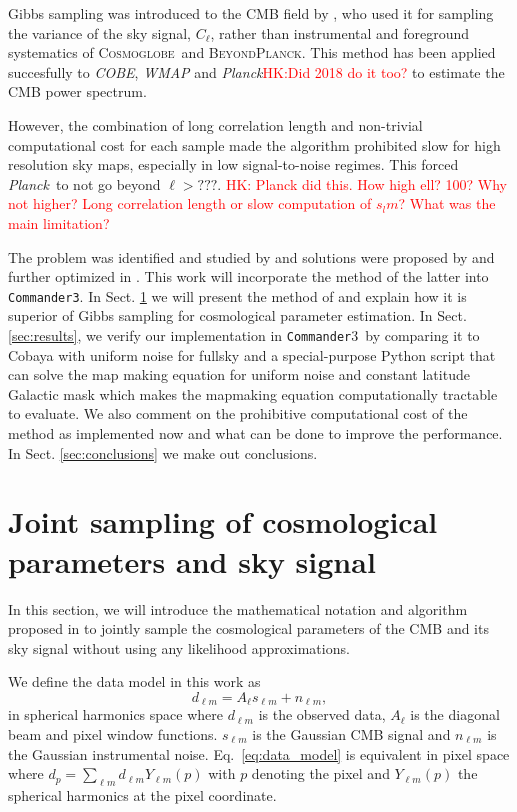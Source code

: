 \documentclass[twocolumn]{../common/aa}
\def\WMAP{\emph{WMAP}}
\def\COBE{\emph{COBE}}
\def\Planck{\emph{Planck}}
\def\commander{\texttt{Commander}}
\def\commanderthree{\texttt{Commander3}}
\newcommand{\BP}{\textsc{BeyondPlanck}}
\newcommand{\cosmoglobe}{\textsc{Cosmoglobe}}
\begin{document}
Gibbs sampling was introduced to the CMB field by \citet{jewell2004}, who used it for sampling the variance of the sky signal, $C_{\ell}$, rather than instrumental and foreground systematics of \cosmoglobe\ and \BP. This method has been applied succesfully to \COBE\citep{wandelt2004}, \WMAP\citep{Eriksen:2007jw} and \Planck\citep{planck2014-a13}\textcolor{red}{HK:Did 2018 do it too?} to estimate the CMB power spectrum.

However, the combination of long correlation length and non-trivial computational cost for each sample made the algorithm prohibited slow for high resolution sky maps, especially in low signal-to-noise regimes. This forced \Planck\ to not go beyond $\ell > ???$. \textcolor{red}{HK: Planck did this. How high ell? 100? Why not higher? Long correlation length or slow computation of $s_lm$? What was the main limitation?}

The problem was identified and studied by \cite{Eriksen:2004ss} and solutions were proposed by \cite{jewell:2009} and further optimized in \citet{racine:2016}. This work will incorporate the method of the latter into \commanderthree. In Sect. \ref{sec:methods} we will present the method of \citet{racine:2016} and explain how it is superior of Gibbs sampling for cosmological parameter estimation. In Sect. \ref{sec:results}, we verify our implementation in \commander3\ by comparing it to Cobaya with uniform noise for fullsky and a special-purpose Python script that can solve the map making equation for uniform noise and constant latitude Galactic mask which makes the mapmaking equation computationally tractable to evaluate. We also comment on the prohibitive computational cost of the method as implemented now and what can be done to improve the performance. In Sect. \ref{sec:conclusions} we make out conclusions.

\section{Joint sampling of cosmological parameters and sky signal}
\label{sec:methods}

In this section, we will introduce the mathematical notation and algorithm proposed in \citet{racine:2016} to jointly sample the cosmological parameters of the CMB and its sky signal without using any likelihood approximations.

We define the data model in this work as
\begin{equation}
    \label{eq:data_model}
    d_{\ell m} = A_{\ell} s_{\ell m} + n_{\ell m},
\end{equation}
in spherical harmonics space where $d_{\ell m}$ is the observed data, $A_\ell$ is the diagonal beam and pixel window functions. $s_{\ell m}$ is the Gaussian CMB signal and $n_{\ell m}$ is the Gaussian instrumental noise. Eq.~\eqref{eq:data_model} is equivalent in pixel space where ${d_p = \sum_{\ell m} d_{\ell m} Y_{\ell m}(p)}$ with $p$ denoting the pixel and $Y_{\ell m}(p)$ the spherical harmonics at the pixel coordinate.
\end{document}
